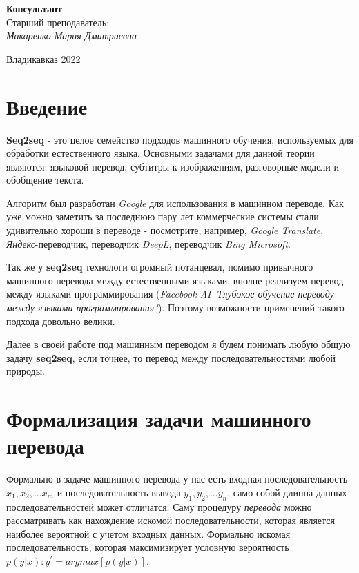 \documentclass[a4paper,12pt]{article}
\begin{document}
	\hfill
	
	\begin{flushright}
		\textbf{Консультант}\\
		Старший преподаватель: \\
		\textit{Макаренко Мария Дмитриевна \underline{\hspace{3cm}}}\\
	\end{flushright}
	
	\normalsize{ \hspace{28pt}} \hfill \break
	\begin{center} Владикавказ 2022 \end{center}
	
	\thispagestyle{empty}
	\tableofcontents
	\thispagestyle{empty}
	\clearpage
	\newtheorem{theorem}{Теорема}
	
	\section{Введение}
	
	 \textbf{Seq2seq} - это целое семейство подходов машинного обучения, используемых для обработки естественного языка. Основными задачами для данной теории являются: языковой перевод, субтитры к изображениям, разговорные модели и обобщение текста.
	 
	 Алгоритм был разработан \textit{Google} для использования в машинном переводе. Как уже можно заметить за последнюю пару лет коммерческие системы стали удивительно хороши в  переводе - посмотрите, например, \textit{Google Translate}, \textit{Яндекс}-переводчик, переводчик \textit{DeepL}, переводчик \textit{Bing Microsoft}.
	 
	 Так же у \textbf{seq2seq} технологи огромный потанцевал, помимо привычного машинного перевода между естественными языками, вполне реализуем перевод между языками программирования (\textit{Facebook AI "Глубокое обучение переводу между языками программирования"}). Поэтому возможности применений такого подхода довольно велики. 
	 
	 Далее в своей работе под машинным переводом я будем понимать любую общую задачу \textbf{seq2seq}, если точнее, то перевод между последовательностями любой природы.
	 
	 \clearpage
	 
	 \section{Формализация задачи машинного перевода}
	 Формально в задаче машинного перевода у нас есть входная последовательность $x_{1}, x_{2}, ... x_{m}$ и последовательность вывода $y_{1}, y_{2}, ... y_{n}$, само собой длинна данных последовательностей может отличатся. Саму процедуру \textit{перевода} можно рассматривать как нахождение искомой последовательности, которая является наиболее вероятной с учетом входных данных. Формально искомая последовательность, которая максимизирует условную вероятность $p(y|x): y^{'} = argmax[p(y|x)]$.
	 
\end{document}
